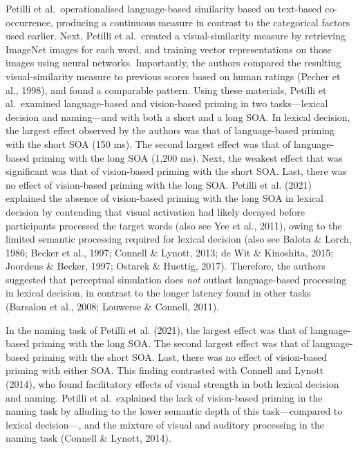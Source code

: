 \documentclass[
  12pt,
  man,floatsintext]{apa7}
\begin{document}
Petilli et al.~operationalised language-based similarity based on text-based co-occurrence, producing a continuous measure in contrast to the categorical factors used earlier. Next, Petilli et al.~created a visual-similarity measure by retrieving ImageNet images for each word, and training vector representations on those images using neural networks. Importantly, the authors compared the resulting visual-similarity measure to previous scores based on human ratings (Pecher et al., 1998), and found a comparable pattern. Using these materials, Petilli et al.~examined language-based and vision-based priming in two tasks---lexical decision and naming---and with both a short and a long SOA. In lexical decision, the largest effect observed by the authors was that of language-based priming with the short SOA (150 ms). The second largest effect was that of language-based priming with the long SOA (1,200 ms). Next, the weakest effect that was significant was that of vision-based priming with the short SOA. Last, there was no effect of vision-based priming with the long SOA. Petilli et al. (2021) explained the absence of vision-based priming with the long SOA in lexical decision by contending that visual activation had likely decayed before participants processed the target words (also see Yee et al., 2011), owing to the limited semantic processing required for lexical decision (also see Balota \& Lorch, 1986; Becker et al., 1997; Connell \& Lynott, 2013; de Wit \& Kinoshita, 2015; Joordens \& Becker, 1997; Ostarek \& Huettig, 2017). Therefore, the authors suggested that perceptual simulation does \emph{not} outlast language-based processing in lexical decision, in contrast to the longer latency found in other tasks (Barsalou et al., 2008; Louwerse \& Connell, 2011).

In the naming task of Petilli et al. (2021), the largest effect was that of language-based priming with the long SOA. The second largest effect was that of language-based priming with the short SOA. Last, there was no effect of vision-based priming with either SOA. This finding contrasted with Connell and Lynott (2014), who found facilitatory effects of visual strength in both lexical decision and naming. Petilli et al.~explained the lack of vision-based priming in the naming task by alluding to the lower semantic depth of this task---compared to lexical decision---, and the mixture of visual and auditory processing in the naming task (Connell \& Lynott, 2014).
\end{document}
